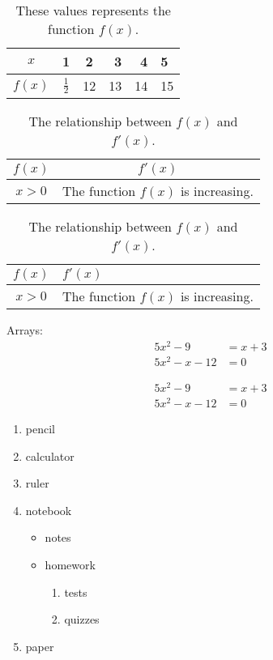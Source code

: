 \documentclass[11pt, a4paper]{article}
\begin{document}
\vspace{1cm}

\begin{table}[H]
\centering
\def\arraystretch{1.5}
\begin{tabular}{|c||c|c|r|r|l|}
\hline
$x$ & 1 & 2 & 3 & 4 & 5 \\ \hline
$f(x)$ & $\frac{1}{2}$ & 12 & 13 & 14 & 15 \\ \hline
\end{tabular}
\caption{These values represents the function $f(x)$.}
\end{table}

\vspace{1cm}

\begin{table}[H]
\centering
\def\arraystretch{1.5}
\begin{tabular}{|c|c|}
\hline
$f(x)$ & $f'(x)$ \\ \hline
$x>0$ & The function $f(x)$ is increasing. \\ \hline
\end{tabular}
\caption{The relationship between $f(x)$ and $f'(x)$.}
\end{table}

\vspace{1cm}

\begin{table}[H]
\centering
\def\arraystretch{1.5}
\begin{tabular}{|c|p{2in}|}
\hline
$f(x)$ & $f'(x)$ \\ \hline
$x>0$ & The function $f(x)$ is increasing.  \\ \hline
\end{tabular}
\caption{The relationship between $f(x)$ and $f'(x)$.}
\end{table}

Arrays:
\begin{align}
5x^2-9&=x+3 \\
5x^2-x-12&=0
\end{align}

\begin{align*}
5x^2-9&=x+3 \\
5x^2-x-12&=0
\end{align*}

\begin{enumerate}
    \item pencil
    \item calculator
    \item ruler
    \item notebook
        \begin{itemize}
            \item notes
            \item homework
                \begin{enumerate}
                    \item tests
                    \item quizzes
                \end{enumerate}
        \end{itemize} 
    \item paper
\end{enumerate}
\end{document}
